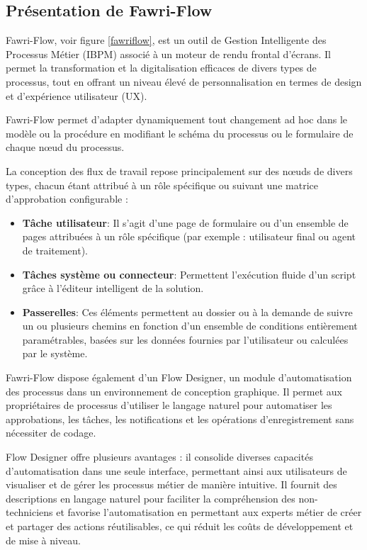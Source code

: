 \subsection{Présentation de Fawri-Flow}


\hspace{\parindent}Fawri-Flow, voir figure \ref*{fawriflow}, est un outil de Gestion Intelligente des Processus Métier (IBPM) associé à un moteur de rendu frontal d'écrans. Il permet la transformation et la digitalisation efficaces de divers types de processus, tout en offrant un niveau élevé de personnalisation en termes de design et d'expérience utilisateur (UX).

Fawri-Flow permet d'adapter dynamiquement tout changement ad hoc dans le modèle ou la procédure en modifiant le schéma du processus ou le formulaire de chaque nœud du processus.

La conception des flux de travail repose principalement sur des nœuds de divers types, chacun étant attribué à un rôle spécifique ou suivant une matrice d'approbation configurable :

\begin{itemize}
    \item \textbf{Tâche utilisateur}: Il s'agit d'une page de formulaire ou d'un ensemble de pages attribuées à un rôle spécifique (par exemple : utilisateur final ou agent de traitement).

    \item \textbf{Tâches système ou connecteur}: Permettent l'exécution fluide d'un script grâce à l'éditeur intelligent de la solution.
    \item \textbf{Passerelles}: Ces éléments permettent au dossier ou à la demande de suivre un ou plusieurs chemins en fonction d'un ensemble de conditions entièrement paramétrables, basées sur les données fournies par l'utilisateur ou calculées par le système.
\end{itemize}

Fawri-Flow dispose également d'un Flow Designer, un module d'automatisation des processus dans un environnement de conception graphique. Il permet aux propriétaires de processus d'utiliser le langage naturel pour automatiser les approbations, les tâches, les notifications et les opérations d'enregistrement sans nécessiter de codage.

Flow Designer offre plusieurs avantages : il consolide diverses capacités d'automatisation dans une seule interface, permettant ainsi aux utilisateurs de visualiser et de gérer les processus métier de manière intuitive. Il fournit des descriptions en langage naturel pour faciliter la compréhension des non-techniciens et favorise l'automatisation en permettant aux experts métier de créer et partager des actions réutilisables, ce qui réduit les coûts de développement et de mise à niveau.

